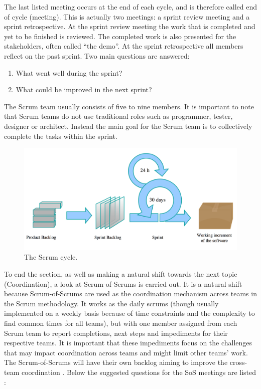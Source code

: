 The last listed meeting occurs at the end of each cycle, and is therefore called end of cycle (meeting). This is actually two meetings: a sprint review meeting and a sprint retrospective. At the sprint review meeting the work that is completed and yet to be finished is reviewed. The completed work is also presented for the stakeholders, often called  ``the demo''. At the sprint retrospective all members reflect on the past sprint. Two main questions are answered:

\begin{enumerate}
  \item What went well during the sprint?
  \item What could be improved in the next sprint?
\end{enumerate}

The Scrum team usually consists of five to nine members. It is important to note that Scrum teams do not use traditional roles such as programmer, tester, designer or architect. Instead the main goal for the Scrum team is to collectively complete the tasks within the sprint.

\begin{figure}
\centering
\includegraphics[width=150mm]{images/chapters/development_models/Scrum.png}
\caption{The Scrum cycle.}
\label{scrum}
\end{figure}

To end the section, as well as making a natural shift towards the next topic (Coordination), a look at Scrum-of-Scrums is carried out. It is a natural shift because Scrum-of-Scrums are used as the coordination mechanism across teams in the Scrum methodology. It works as the daily scrums (though usually implemented on a weekly basis because of time constraints and the complexity to find common times for all teams), but with one member assigned from each Scrum team to report completions, next steps and impediments for their respective teams. It is important that these impediments focus on the challenges that may impact coordination across teams and might limit other teams' work. The Scrum-of-Scrums will have their own backlog aiming to improve the cross-team coordination \cite{Sutherland2001}. Below the suggested questions for the SoS meetings are listed \cite{Cohn2007}:

